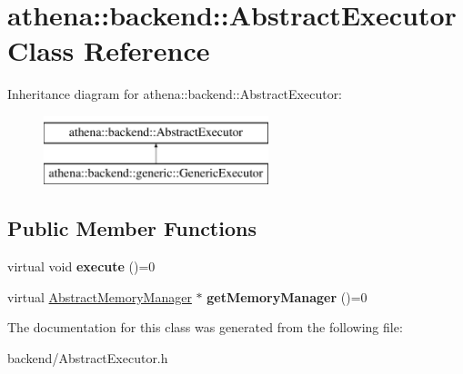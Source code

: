 \hypertarget{classathena_1_1backend_1_1_abstract_executor}{}\section{athena\+:\+:backend\+:\+:Abstract\+Executor Class Reference}
\label{classathena_1_1backend_1_1_abstract_executor}
Inheritance diagram for athena\+:\+:backend\+:\+:Abstract\+Executor\+:\begin{figure}[H]
\begin{center}
\leavevmode
\includegraphics[height=2.000000cm]{classathena_1_1backend_1_1_abstract_executor}
\end{center}
\end{figure}
\subsection*{Public Member Functions}
\begin{DoxyCompactItemize}
\item 
\mbox{\label{classathena_1_1backend_1_1_abstract_executor_a5f179146ae76002b678a4862553f87ce}} 
virtual void {\bfseries execute} ()=0
\item 
\mbox{\label{classathena_1_1backend_1_1_abstract_executor_a6d61486e2a06500c9c0aa1e03a475e4a}} 
virtual \mbox{\hyperlink{classathena_1_1backend_1_1_abstract_memory_manager}{Abstract\+Memory\+Manager}} $\ast$ {\bfseries get\+Memory\+Manager} ()=0
\end{DoxyCompactItemize}


The documentation for this class was generated from the following file\+:\begin{DoxyCompactItemize}
\item 
backend/Abstract\+Executor.\+h\end{DoxyCompactItemize}
